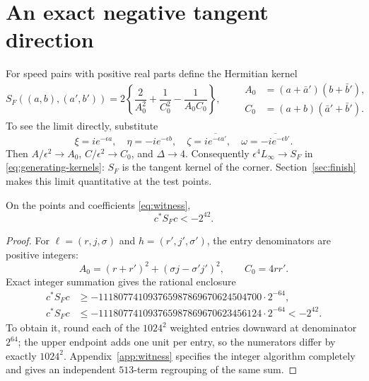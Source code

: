 \section{An exact negative tangent direction}\label{sec:witness}
For speed pairs with positive real parts define the Hermitian kernel
\begin{equation}
 S_F((a,b),(a',b'))=2\left\{\frac2{A_0^2}+\frac1{C_0^2}
                                      -\frac1{A_0C_0}\right\},
 \qquad
 \begin{aligned}
 A_0&=(a+\bar a')(b+\bar b'),\\
 C_0&=(a+b)(\bar a'+\bar b').
 \end{aligned}                                          \label{eq:tangent-kernel}
\end{equation}
To see the limit directly, substitute
\[
 \xi=i e^{-\epsilon a},\quad \eta=-i e^{-\epsilon b},\quad
 \zeta=\overline{i e^{-\epsilon a'}},\quad
 \omega=\overline{-i e^{-\epsilon b'}}.
\]
Then $A/\epsilon^2\to A_0$, $C/\epsilon^2\to C_0$, and $\Delta{}\to4$.
Consequently $\epsilon^4L_\infty\to S_F$ in \eqref{eq:generating-kernels}: $S_F$ is the
tangent kernel of the corner. Section~\ref{sec:finish} makes this limit
quantitative at the test points.

\begin{lemma}\label{lem:witness} On the points and coefficients \eqref{eq:witness},
\begin{equation}
                           c^*S_Fc<-2^{42}.             \label{eq:negative-pairing}
\end{equation}
\end{lemma}
\begin{proof} For \(\ell=(r,j,\sigma)\) and \(h=(r',j',\sigma')\), the
entry denominators are positive integers:
\[
 A_0=(r+r')^2+(\sigma j-\sigma'j')^2,\qquad C_0=4rr'.
\]
Exact integer summation gives the rational enclosure
\begin{equation}\label{eq:witness-enclosure}
\begin{aligned}
 c^*S_Fc&\ge-111807741093765987869670624504700\cdot2^{-64},\\
 c^*S_Fc&\le-111807741093765987869670623456124\cdot2^{-64}<-2^{42}.
\end{aligned}
\end{equation}
To obtain it, round each of the \(1024^2\) weighted entries downward at
denominator \(2^{64}\); the upper endpoint adds one unit per entry, so
the numerators differ by exactly \(1024^2\).
Appendix~\ref{app:witness} specifies the integer algorithm completely and
gives an independent $513$-term regrouping of the same sum.
\end{proof}

